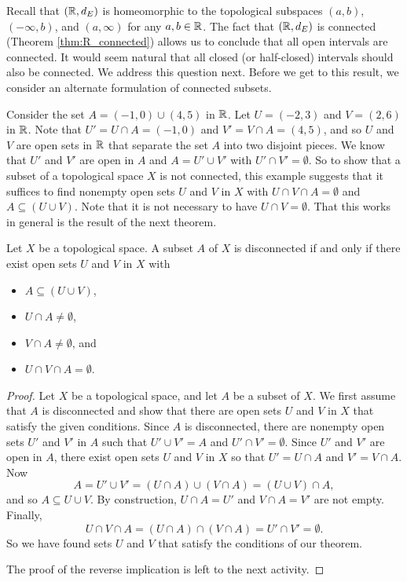 Recall that $(\mathbb{R},d_E)$ is homeomorphic to the topological subspaces $(a,b)$, $(-\infty, b)$, and $(a,\infty)$ for any $a, b \in \mathbb{R}$. The fact that $(\mathbb{R}, d_E)$ is connected (Theorem \ref{thm:R_connected}) allows us to conclude that all open intervals are connected. It would seem natural that all closed (or half-closed) intervals should also be connected. We address this question next. Before we get to this result, we consider an alternate formulation of connected subsets. 

Consider the set $A = (-1,0) \cup (4,5)$ in $\mathbb{R}$. Let $U = (-2,3)$ and $V=(2,6)$ in $\mathbb{R}$. Note that $U' = U \cap A = (-1,0)$ and $V' = V \cap A = (4,5)$, and so $U$ and $V$ are open sets in $\mathbb{R}$ that separate the set $A$ into two disjoint pieces. We know that $U'$ and $V'$ are open in $A$ and $A = U' \cup V'$ with $U' \cap V' = \emptyset$. So to show that a subset of a topological space $X$ is not connected, this example suggests that it suffices to find nonempty open sets $U$ and $V$ in $X$ with $U \cap V \cap A = \emptyset$ and $A \subseteq (U \cup V)$. Note that it is not necessary to have $U \cap V = \emptyset$.  That this works in general is the result of the next theorem. 

\begin{theorem} \label{thm:conn_subset} Let $X$ be a topological space. A subset $A$ of $X$ is disconnected if and only if there exist open sets $U$ and $V$ in $X$ with 
\begin{itemize}
\item $A \subseteq (U \cup V)$,
\item $U \cap A \neq \emptyset$, 
\item $V \cap A \neq \emptyset$, and
\item $U \cap V \cap A = \emptyset$.
\end{itemize}
\end{theorem}

\begin{proof} Let $X$ be a topological space, and let $A$ be a subset of $X$. We first assume that $A$ is disconnected and show that there are open sets $U$ and $V$ in $X$ that satisfy the given conditions. Since $A$ is disconnected, there are nonempty open sets $U'$ and $V'$ in $A$ such that $U' \cup V' = A$ and $U' \cap V' = \emptyset$. Since $U'$ and $V'$ are open in $A$, there exist open sets $U$ and $V$ in $X$ so that $U' = U \cap A$ and $V' = V \cap A$. Now 
\[A = U' \cup V' = (U \cap A) \cup (V \cap A) = (U \cup V) \cap A,\]
and so $A \subseteq U \cup V$. By construction, $U \cap A = U'$ and $V \cap A = V'$ are not empty. Finally, 
\[U \cap V \cap A = (U \cap A) \cap (V \cap A) = U' \cap V' = \emptyset.\]
So we have found sets $U$ and $V$ that satisfy the conditions of our theorem.

The proof of the reverse implication is left to the next activity.

\end{proof} 



